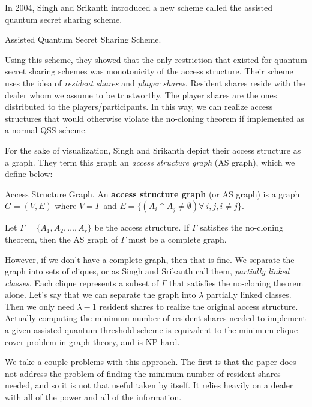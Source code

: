 In 2004, Singh and Srikanth introduced a new scheme called the assisted quantum secret sharing scheme. 

\begin{definition}{Assisted Quantum Secret Sharing Scheme.}
    \label{defn:aqss}
\end{definition}

Using this scheme, they showed that the only restriction that existed for quantum secret sharing schemes was monotonicity of the access structure. Their scheme uses the idea of \textit{resident shares} and \textit{player shares}. Resident shares reside with the dealer whom we assume to be trustworthy. The player shares are the ones distributed to the players/participants. In this way, we can realize access structures that would otherwise violate the no-cloning theorem if implemented as a normal QSS scheme. 

For the sake of visualization, Singh and Srikanth depict their access structure as a graph. They term this graph an \textit{access structure graph} (AS graph), which we define below:

\begin{definition}{Access Structure Graph.}
    \label{defn:access-structure-graph}
    An \textbf{access structure graph} (or AS graph) is a graph $G = (V,E)$ where $V = \Gamma$ and $E = \{(A_i \cap A_j \neq \emptyset) \forall\:i,j,i\neq j\}$.
\end{definition}

\begin{theorem}
    \label{thm:complete-as-graph}
    Let $\Gamma = \{A_1,A_2,\dots,A_r\}$ be the access structure. If $\Gamma$ satisfies the no-cloning theorem, then the AS graph of $\Gamma$ must be a complete graph.
\end{theorem}

However, if we don't have a complete graph, then that is fine. We separate the graph into sets of cliques, or as Singh and Srikanth call them, \textit{partially linked classes}. Each clique represents a subset of $\Gamma$ that satisfies the no-cloning theorem alone. Let's say that we can separate the graph into $\lambda$ partially linked classes. Then we only need $\lambda - 1$ resident shares to realize the original access structure. Actually computing the minimum number of resident shares needed to implement a given assisted quantum threshold scheme is equivalent to the minimum clique-cover problem in graph theory, and is NP-hard.

We take a couple problems with this approach. The first is that the paper does not address the problem of finding the minimum number of resident shares needed, and so it is not that useful taken by itself. It relies heavily on a dealer with all of the power and all of the information. 

